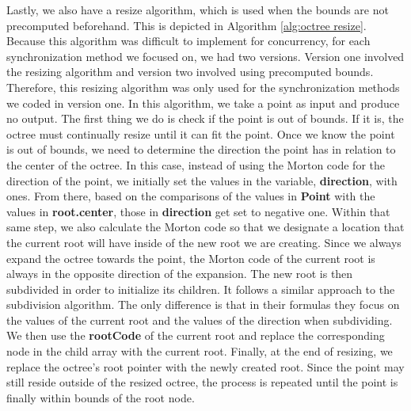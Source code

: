\documentclass[conference]{IEEEtran}
\begin{document}
Lastly, we also have a resize algorithm, which is used when the bounds are not precomputed beforehand. This is depicted in Algorithm \ref{alg:octree resize}. Because this algorithm was difficult to implement for concurrency, for each synchronization method we focused on, we had two versions. Version one involved the resizing algorithm and version two involved using precomputed bounds. Therefore, this resizing algorithm was only used for the synchronization methods we coded in version one. In this algorithm, we take a point as input and produce no output. The first thing we do is check if the point is out of bounds. If it is, the octree must continually resize until it can fit the point. Once we know the point is out of bounds, we need to determine the direction the point has in relation to the center of the octree. In this case, instead of using the Morton code for the direction of the point, we initially set the values in the variable, \textbf{direction}, with ones. From there, based on the comparisons of the values in \textbf{Point} with the values in \textbf{root.center}, those in \textbf{direction} get set to negative one. Within that same step, we also calculate the Morton code so that we designate a location that the current root will have inside of the new root we are creating. Since we always expand the octree towards the point, the Morton code of the current root is always in the opposite direction of the expansion. The new root is then subdivided in order to initialize its children. It follows a similar approach to the subdivision algorithm. The only difference is that in their formulas they focus on the values of the current root and the values of the direction when subdividing. We then use the \textbf{rootCode} of the current root and replace the corresponding node in the child array with the current root. Finally, at the end of resizing, we replace the octree’s root pointer with the newly created root. Since the point may still reside outside of the resized octree, the process is repeated until the point is finally within bounds of the root node.
\end{document}
